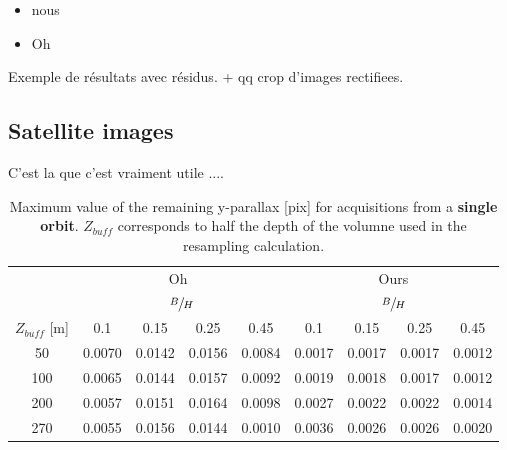 \documentclass{ipol}
\begin{document}
\begin{itemize}
\item nous
\item Oh
\end{itemize}

Exemple de résultats avec résidus. + qq crop d'images rectifiees.

\subsection{Satellite images}

C'est la que c'est vraiment utile .... 

 
\begin{table}

\begin{center}
\begin{tabular}{|c|c|c|c|c||c|c|c|c|}

\multicolumn{1}{c}{}  & \multicolumn{4}{c}{Oh~\cite{Oh2011}} & \multicolumn{4}{c}{Ours}   \\
 \cline{2-9} 
 \multicolumn{1}{c}{}  & \multicolumn{4}{|c||}{ $\sfrac{B}{H}$ } & \multicolumn{4}{|c|}{$\sfrac{B}{H}$ }  \\
 \multicolumn{1}{c|}{$Z_{buff}$ [m]}  &  0.1 &  0.15   & 0.25  &  0.45 &  0.1 &  0.15   & 0.25  &  0.45   \\
 \cline{1-9}
  
 50 & 0.0070  & 0.0142    & 0.0156   &  0.0084   &  0.0017   &  0.0017  & 0.0017  & 0.0012\\
100 & 0.0065  & 0.0144    & 0.0157   &  0.0092   &  0.0019   &  0.0018  & 0.0017  & 0.0012\\
200 & 0.0057  & 0.0151    & 0.0164   &  0.0098   &  0.0027   &  0.0022  & 0.0022  & 0.0014\\
270 & 0.0055  & 0.0156    & 0.0144   &  0.0010   &  0.0036   &  0.0026  & 0.0026  & 0.0020\\
\hline 

\end{tabular}
\end{center}
\caption{Maximum value of the remaining y-parallax [pix] for acquisitions from a \textbf{single orbit}. $Z_{buff}$ corresponds to half the depth of the volumne used in the resampling calculation.}\label{tab:PHR1mono}
\end{table}
\end{document}
